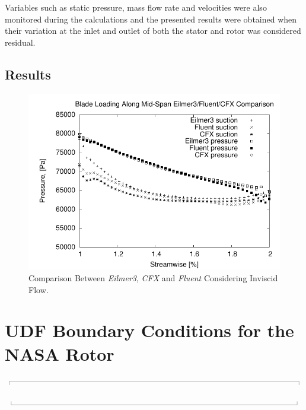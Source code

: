 \documentclass[12pt,a4paper,twoside]{article}
\newcommand{\topbar}{\ensuremath{
    \rule{0.1mm}{2.0mm} \rule[2.0mm]{159.5mm}{0.1mm} \rule{0.1mm}{2.0mm}
}}
\newcommand{\bottombar}{\ensuremath{
    \rule{0.1mm}{2.0mm} \rule{159.5mm}{0.1mm} \rule{0.1mm}{2.0mm}
}}
\begin{document}
Variables such as static pressure, mass flow rate and velocities were also monitored during the calculations and the presented results were obtained when their variation at the inlet and outlet of both the stator and rotor was considered residual.

\clearpage

\subsection{Results}
\label{sec:kofsky_results}
%
\begin{figure}[htbp]
  \centering
  \includegraphics[width=0.60\linewidth]{./figures/Blade_Loading_Plot_Eilmer3_Fluent_CFX_Mesh_D.pdf}
  \vskip-0.2cm
  \caption{Comparison Between \textit{Eilmer3}, \textit{CFX} and \textit{Fluent} Considering Inviscid Flow.}
  \label{Comparison_Eilmer_Fluent}
\end{figure}

\cleardoublepage




\cleardoublepage
\appendix

\section{UDF Boundary Conditions for the NASA Rotor}
\label{user-defined-bc-sec}
%
\topbar

\bottombar \\


\cleardoublepage
\printindex
\end{document}
